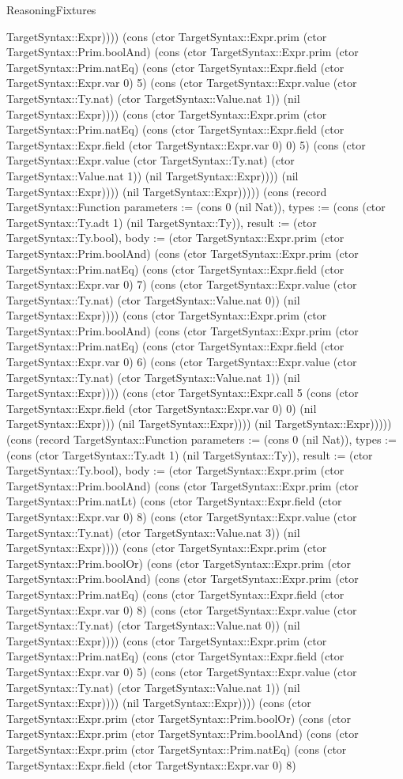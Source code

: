 \begin{lexlean}{ReasoningFixtures}
\begin{semanticmodule}
{TargetSyntax::Expr)))) (cons (ctor TargetSyntax::Expr.prim (ctor TargetSyntax::Prim.boolAnd) (cons (ctor TargetSyntax::Expr.prim (ctor TargetSyntax::Prim.natEq) (cons (ctor TargetSyntax::Expr.field (ctor TargetSyntax::Expr.var 0) 5) (cons (ctor TargetSyntax::Expr.value (ctor TargetSyntax::Ty.nat) (ctor TargetSyntax::Value.nat 1)) (nil TargetSyntax::Expr)))) (cons (ctor TargetSyntax::Expr.prim (ctor TargetSyntax::Prim.natEq) (cons (ctor TargetSyntax::Expr.field (ctor TargetSyntax::Expr.field (ctor TargetSyntax::Expr.var 0) 0) 5) (cons (ctor TargetSyntax::Expr.value (ctor TargetSyntax::Ty.nat) (ctor TargetSyntax::Value.nat 1)) (nil TargetSyntax::Expr)))) (nil TargetSyntax::Expr)))) (nil TargetSyntax::Expr))))}) (cons (record TargetSyntax::Function {parameters := (cons 0 (nil Nat)), types := (cons (ctor TargetSyntax::Ty.adt 1) (nil TargetSyntax::Ty)), result := (ctor TargetSyntax::Ty.bool), body := (ctor TargetSyntax::Expr.prim (ctor TargetSyntax::Prim.boolAnd) (cons (ctor TargetSyntax::Expr.prim (ctor TargetSyntax::Prim.natEq) (cons (ctor TargetSyntax::Expr.field (ctor TargetSyntax::Expr.var 0) 7) (cons (ctor TargetSyntax::Expr.value (ctor TargetSyntax::Ty.nat) (ctor TargetSyntax::Value.nat 0)) (nil TargetSyntax::Expr)))) (cons (ctor TargetSyntax::Expr.prim (ctor TargetSyntax::Prim.boolAnd) (cons (ctor TargetSyntax::Expr.prim (ctor TargetSyntax::Prim.natEq) (cons (ctor TargetSyntax::Expr.field (ctor TargetSyntax::Expr.var 0) 6) (cons (ctor TargetSyntax::Expr.value (ctor TargetSyntax::Ty.nat) (ctor TargetSyntax::Value.nat 1)) (nil TargetSyntax::Expr)))) (cons (ctor TargetSyntax::Expr.call 5 (cons (ctor TargetSyntax::Expr.field (ctor TargetSyntax::Expr.var 0) 0) (nil TargetSyntax::Expr))) (nil TargetSyntax::Expr)))) (nil TargetSyntax::Expr))))}) (cons (record TargetSyntax::Function {parameters := (cons 0 (nil Nat)), types := (cons (ctor TargetSyntax::Ty.adt 1) (nil TargetSyntax::Ty)), result := (ctor TargetSyntax::Ty.bool), body := (ctor TargetSyntax::Expr.prim (ctor TargetSyntax::Prim.boolAnd) (cons (ctor TargetSyntax::Expr.prim (ctor TargetSyntax::Prim.natLt) (cons (ctor TargetSyntax::Expr.field (ctor TargetSyntax::Expr.var 0) 8) (cons (ctor TargetSyntax::Expr.value (ctor TargetSyntax::Ty.nat) (ctor TargetSyntax::Value.nat 3)) (nil TargetSyntax::Expr)))) (cons (ctor TargetSyntax::Expr.prim (ctor TargetSyntax::Prim.boolOr) (cons (ctor TargetSyntax::Expr.prim (ctor TargetSyntax::Prim.boolAnd) (cons (ctor TargetSyntax::Expr.prim (ctor TargetSyntax::Prim.natEq) (cons (ctor TargetSyntax::Expr.field (ctor TargetSyntax::Expr.var 0) 8) (cons (ctor TargetSyntax::Expr.value (ctor TargetSyntax::Ty.nat) (ctor TargetSyntax::Value.nat 0)) (nil TargetSyntax::Expr)))) (cons (ctor TargetSyntax::Expr.prim (ctor TargetSyntax::Prim.natEq) (cons (ctor TargetSyntax::Expr.field (ctor TargetSyntax::Expr.var 0) 5) (cons (ctor TargetSyntax::Expr.value (ctor TargetSyntax::Ty.nat) (ctor TargetSyntax::Value.nat 1)) (nil TargetSyntax::Expr)))) (nil TargetSyntax::Expr)))) (cons (ctor TargetSyntax::Expr.prim (ctor TargetSyntax::Prim.boolOr) (cons (ctor TargetSyntax::Expr.prim (ctor TargetSyntax::Prim.boolAnd) (cons (ctor TargetSyntax::Expr.prim (ctor TargetSyntax::Prim.natEq) (cons (ctor TargetSyntax::Expr.field (ctor TargetSyntax::Expr.var 0) 8) }
\end{semanticmodule}
\end{lexlean}
